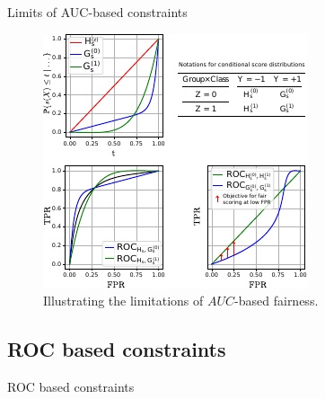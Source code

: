 \begin{frame}{Limits of AUC-based constraints}
    \begin{figure}[t]
        \centering
        \includegraphics[width=0.6\columnwidth]{images/original_paper/example_simple_dists_explained_with_table2.pdf}
        \caption{Illustrating the limitations of $AUC$-based fairness.}
        \label{fig:example-1}
    \end{figure}
\end{frame}

\subsection{ROC based constraints}
\begin{frame}{ROC based constraints}
    
\end{frame}
